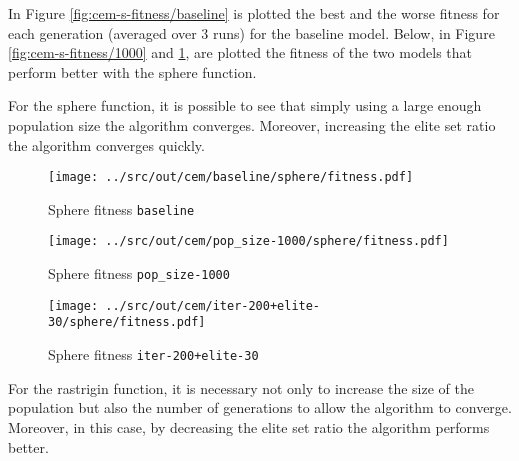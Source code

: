 In Figure \ref{fig:cem-s-fitness/baseline} is plotted the best and the worse fitness for each generation (averaged over 3 runs) for the baseline model. Below, in Figure \ref{fig:cem-s-fitness/1000} and \ref{fig:cem-s-fitness/200}, are plotted the fitness of the two models that perform better with the sphere function.

For the sphere function, it is possible to see that simply using a large enough population size the algorithm converges. 
Moreover, increasing the elite set ratio the algorithm converges quickly.
 
 \begin{figure}[H]
 	\centering
 	\begin{minipage}[b]{.6\textwidth}
 		\texttt{[image: ../src/out/cem/baseline/sphere/fitness.pdf]}	
 	\end{minipage}
	 \caption{Sphere fitness \texttt{baseline}}
	 \label{fig:cem-s-fitness/baseline}
	 
	 \begin{minipage}[b]{.6\textwidth}
	 	\texttt{[image: ../src/out/cem/pop\_size-1000/sphere/fitness.pdf]}	
	 \end{minipage}
	 \caption{Sphere fitness \texttt{pop\_size-1000}}
	 \label{fig:cem-s-fitness/1000}
	 
	 \begin{minipage}[b]{.6\textwidth}
	 	\texttt{[image: ../src/out/cem/iter-200+elite-30/sphere/fitness.pdf]}	
	 \end{minipage}
	 \caption{Sphere fitness \texttt{iter-200+elite-30}}
	 \label{fig:cem-s-fitness/200}
\end{figure}


For the rastrigin function, it is necessary not only to increase the size of the population but also the number of generations to allow the algorithm to converge. Moreover, in this case, by decreasing the elite set ratio the algorithm performs better.  

